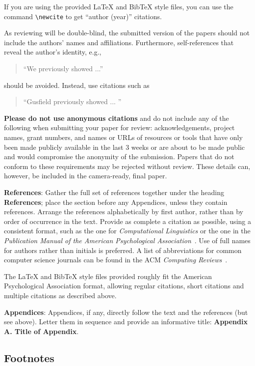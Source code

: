 \documentclass[11pt]{article}
\begin{document}
If you are using the provided \LaTeX{} and Bib\TeX{} style files, you
can use the command \verb|\newcite| to get ``author (year)'' citations.

As reviewing will be double-blind, the submitted version of the papers
should not include the authors' names and affiliations. Furthermore,
self-references that reveal the author's identity, e.g.,
\begin{quote}
``We previously showed \cite{Gusfield:97} ...''  
\end{quote}
should be avoided. Instead, use citations such as 
\begin{quote}
``Gusfield 
previously showed ... ''
\end{quote}

\textbf{Please do not use anonymous citations} and do not include
any of the following when submitting your paper for review:
acknowledgements, project names, grant numbers, and names or URLs of
resources or tools that have only been made publicly available in
the last 3 weeks or are about to be made public and would compromise the anonymity of the submission.
Papers that do not
conform to these requirements may be rejected without review.
These details can, however, be included in the camera-ready, final paper.

\textbf{References}: Gather the full set of references together under
the heading {\bf References}; place the section before any Appendices,
unless they contain references. Arrange the references alphabetically
by first author, rather than by order of occurrence in the text.
Provide as complete a citation as possible, using a consistent format,
such as the one for {\em Computational Linguistics\/} or the one in the 
{\em Publication Manual of the American 
Psychological Association\/}~\cite{APA:83}.  Use of full names for
authors rather than initials is preferred.  A list of abbreviations
for common computer science journals can be found in the ACM 
{\em Computing Reviews\/}~\cite{ACM:83}.

The \LaTeX{} and Bib\TeX{} style files provided roughly fit the
American Psychological Association format, allowing regular citations, 
short citations and multiple citations as described above.

{\bf Appendices}: Appendices, if any, directly follow the text and the
references (but see above).  Letter them in sequence and provide an
informative title: {\bf Appendix A. Title of Appendix}.

\subsection{Footnotes}
\end{document}
